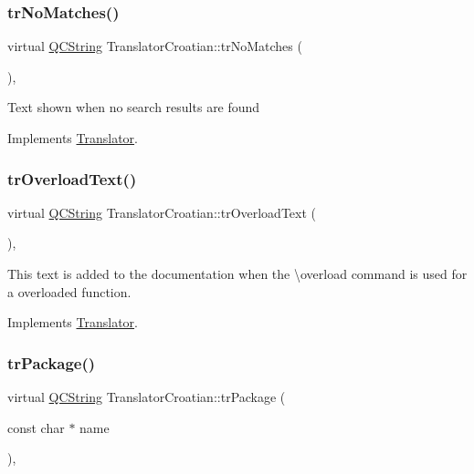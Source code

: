 \mbox{\label{class_translator_croatian_a829bcd344be0a07c509a7828f7cca3d9}} 
\subsubsection{\texorpdfstring{trNoMatches()}{trNoMatches()}}
{\footnotesize\ttfamily virtual \mbox{\hyperlink{class_q_c_string}{Q\+C\+String}} Translator\+Croatian\+::tr\+No\+Matches (\begin{DoxyParamCaption}{ }\end{DoxyParamCaption})\hspace{0.3cm}{\ttfamily [inline]}, {\ttfamily [virtual]}}

Text shown when no search results are found 

Implements \mbox{\hyperlink{class_translator}{Translator}}.

\mbox{\label{class_translator_croatian_a129d80bf2481e1195a1dcb2e44299b8d}} 
\subsubsection{\texorpdfstring{trOverloadText()}{trOverloadText()}}
{\footnotesize\ttfamily virtual \mbox{\hyperlink{class_q_c_string}{Q\+C\+String}} Translator\+Croatian\+::tr\+Overload\+Text (\begin{DoxyParamCaption}{ }\end{DoxyParamCaption})\hspace{0.3cm}{\ttfamily [inline]}, {\ttfamily [virtual]}}

This text is added to the documentation when the \textbackslash{}overload command is used for a overloaded function. 

Implements \mbox{\hyperlink{class_translator}{Translator}}.

\mbox{\label{class_translator_croatian_afe3230caf19cc47f690efbb4016a34e8}} 
\subsubsection{\texorpdfstring{trPackage()}{trPackage()}}
{\footnotesize\ttfamily virtual \mbox{\hyperlink{class_q_c_string}{Q\+C\+String}} Translator\+Croatian\+::tr\+Package (\begin{DoxyParamCaption}\item[{const char $\ast$}]{name }\end{DoxyParamCaption})\hspace{0.3cm}{\ttfamily [inline]}, {\ttfamily [virtual]}}

